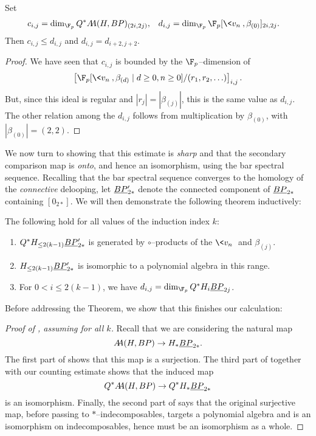 \begin{corollary}
Set
\begin{align*}
c_{i,j} & = \dim_{\F_p} Q^* \AA(H, BP)_{(2i, 2j)}, &
d_{i,j} & = \dim_{\F_p} \F_p[\<v_n\>, \beta_{(0)}]_{2i,2j}.
\end{align*}
Then \(c_{i,j} \le d_{i,j}\) and \(d_{i,j} = d_{i+2,j+2}\).
\end{corollary}
\begin{proof}
We have seen that \(c_{i,j}\) is bounded by the \(\F_p\)--dimension of \[\left[\F_p[\<v_n\>, \beta_{(d)} \mid d \ge 0, n \ge 0] / (r_1, r_2, \ldots)\right]_{i,j}.\]  But, since this ideal is regular and \(|r_j| = |\beta_{(j)}|\), this is the same value as \(d_{i,j}\).  The other relation among the \(d_{i,j}\) follows from multiplication by \(\beta_{(0)}\), with \(|\beta_{(0)}| = (2, 2)\).
\end{proof}

We now turn to showing that this estimate is \emph{sharp} and that the secondary comparison map is \emph{onto}, and hence an isomorphism, using the bar spectral sequence.  Recalling that the bar spectral sequence converges to the homology of the \emph{connective} delooping, let \(\OS{BP}{2*}'\) denote the connected component of \(\OS{BP}{2*}\) containing \([0_{2*}]\).  We will then demonstrate the following theorem inductively:
\begin{theorem}\label{HFpBPCooperationsInduction}
The following hold for all values of the induction index \(k\):
\begin{enumerate}
\item \(Q^* H_{\le 2(k-1)} \OS{BP}{2*}'\) is generated by \(\circ\)--products of the \(\<v_n\>\) and \(\beta_{(j)}\).
\item \(H_{\le 2(k-1)} \OS{BP}{2*}'\) is isomorphic to a polynomial algebra in this range.
\item For \(0 < i \le 2(k-1)\), we have \(d_{i,j} = \dim_{\F_p} Q^* H_i \OS{BP}{2j}\).
\end{enumerate}
\end{theorem}

\noindent Before addressing the Theorem, we show that this finishes our calculation:
\begin{proof}[{Proof of , assuming  for all \(k\)}]
Recall that we are considering the natural map \[\AA(H, BP) \to H_* \OS{BP}{2*}.\]  The first part of  shows that this map is a surjection.  The third part of  together with our counting estimate shows that the induced map \[Q^* \AA(H, BP) \to Q^* H_* \OS{BP}{2*}\] is an isomorphism.  Finally, the second part of  says that the original surjective map, before passing to \(\ast\)--indecomposables, targets a polynomial algebra and is an isomorphism on indecomposables, hence must be an isomorphism as a whole.
\end{proof}

